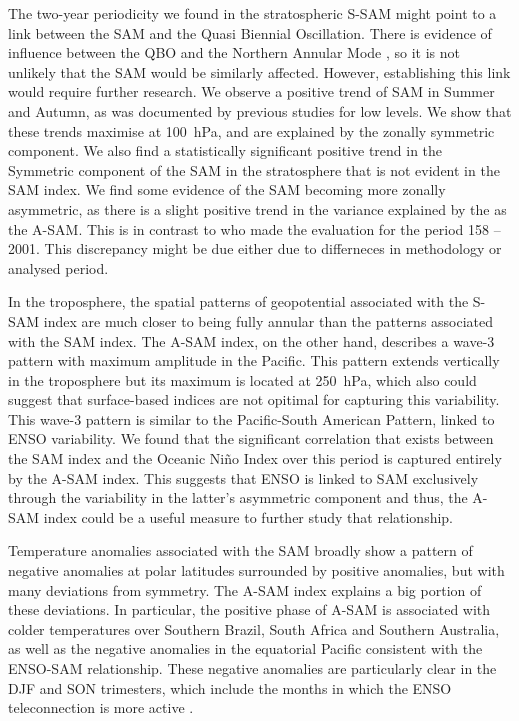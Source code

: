 \documentclass[smallextended]{svjour3}       %
\begin{document}
The two-year periodicity we found in the stratospheric S\nobreakdash-SAM might point to a link between the SAM and the Quasi Biennial Oscillation. There is evidence of influence between the QBO and the Northern Annular Mode \citep[e.g.][]{holton1980, watson2014, zhang2020}, so it is not unlikely that the SAM would be similarly affected. However, establishing this link would require further research.
We observe a positive trend of SAM in Summer and Autumn, as was documented by previous studies \citep[e.g.][ and references therein]{fogt2020} for low levels. We show that these trends maximise at 100~hPa, and are explained by the zonally symmetric component. We also find a statistically significant positive trend in the Symmetric component of the SAM in the stratosphere that is not evident in the SAM index. We find some evidence of the SAM becoming more zonally asymmetric, as there is a slight positive trend in the variance explained by the as the A\nobreakdash-SAM. This is in contrast to \citet{fogt2012} who made the evaluation for the period 158 -- 2001. This discrepancy might be due either due to differneces in methodology or analysed period.

In the troposphere, the spatial patterns of geopotential associated with the S\nobreakdash-SAM index are much closer to being fully annular than the patterns associated with the SAM index. The A\nobreakdash-SAM index, on the other hand, describes a wave-3 pattern with maximum amplitude in the Pacific. This pattern extends vertically in the troposphere but its maximum is located at 250~hPa, which also could suggest that surface-based indices are not opitimal for capturing this variability. This wave-3 pattern is similar to the Pacific-South American Pattern, linked to ENSO variability. We found that the significant correlation that exists between the SAM index and the Oceanic Niño Index over this period is captured entirely by the A\nobreakdash-SAM index. This suggests that ENSO is linked to SAM exclusively through the variability in the latter's asymmetric component and thus, the A\nobreakdash-SAM index could be a useful measure to further study that relationship.

Temperature anomalies associated with the SAM broadly show a pattern of negative anomalies at polar latitudes surrounded by positive anomalies, but with many deviations from symmetry. The A\nobreakdash-SAM index explains a big portion of these deviations. In particular, the positive phase of A\nobreakdash-SAM is associated with colder temperatures over Southern Brazil, South Africa and Southern Australia, as well as the negative anomalies in the equatorial Pacific consistent with the ENSO\nobreakdash-SAM relationship. These negative anomalies are particularly clear in the DJF and SON trimesters, which include the months in which the ENSO teleconnection is more active \citep[e.g.][]{cai2020a}.
\end{document}
